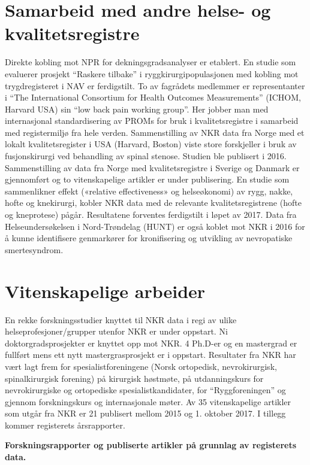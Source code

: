 \documentclass[norsk, a4paper, twocolumn]{report}
\begin{document}
\section{Samarbeid med andre helse- og kvalitetsregistre}\label{sec:samfag}
Direkte kobling mot NPR for dekningsgradsanalyser er etablert.
En studie som evaluerer prosjekt ``Raskere tilbake'' i ryggkirurgipopulasjonen med kobling mot trygdregisteret i NAV er ferdigstilt. To av fagrådets medlemmer er representanter i ``The International Consortium for Health Outcomes Measurements'' (ICHOM, Harvard USA) sin ``low back pain working group''. Her jobber man med internasjonal standardisering av PROMs for bruk i kvalitetsregistre i samarbeid med registermiljø fra hele verden.  Sammenstilling av NKR data fra Norge med et lokalt kvalitetsregister i USA (Harvard, Boston) viste store forskjeller i bruk av fusjonskirurgi ved behandling av spinal stenose. Studien ble publisert i 2016. Sammenstilling av data fra Norge med kvalitetsregistre i Sverige og Danmark er gjennomført og to vitenskapelige artikler er under publisering. En studie som sammenlikner effekt («relative effectiveness» og helseøkonomi) av rygg, nakke, hofte og knekirurgi, kobler NKR data med de relevante kvalitetsregistrene (hofte og kneprotese) pågår. Resultatene forventes ferdigstilt i løpet av 2017. Data fra Helseundersøkelsen i Nord-Trøndelag (HUNT) er også koblet mot NKR i 2016 for å kunne identifisere genmarkører for kronifisering og utvikling av nevropatiske smertesyndrom. 


\section{Vitenskapelige arbeider}\label{sec:vitarb} En rekke forskningsstudier knyttet til NKR data i regi av ulike helseprofesjoner/grupper utenfor NKR er under oppstart. Ni doktorgradsprosjekter er knyttet opp mot NKR. 4 Ph.D-er og en mastergrad er fullført mens ett nytt mastergrasprosjekt er i oppstart. Resultater fra NKR har vært lagt frem for spesialistforeningene (Norsk ortopedisk, nevrokirurgisk, spinalkirurgisk forening) på kirurgisk høstmøte, på utdanningskurs for nevrokirurgiske og ortopediske spesialistkandidater, for ``Ryggforeningen'' og gjennom forskningskurs og internasjonale møter. Av 35 vitenskapelige artikler som  utgår fra NKR er 21 publisert mellom 2015 og 1. oktober 2017. I tillegg kommer registerets årsrapporter.  


\textbf{Forskningsrapporter og publiserte artikler på grunnlag av registerets data.}
\end{document}
